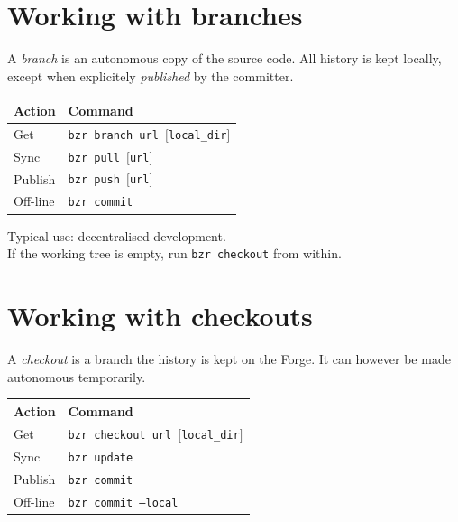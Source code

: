 \documentclass[tumble,foldmark,a4paper]{leaflet}
\begin{document}
\section*{Working with branches}

A \textit{branch} is an autonomous copy of the source code. All history
is kept locally, except when explicitely \textit{published} by the
committer.

\vspace{-0.5em}

\begin{center}
 \begin{tabular}{l l}
  \textbf{Action} & \textbf{Command} \\
  \hline
  Get & \texttt{bzr branch url $[$local\_dir$]$} \\
  Sync & \texttt{bzr pull $[$url$]$} \\
  Publish & \texttt{bzr push $[$url$]$} \\
  Off-line & \texttt{bzr commit} \\
 \end{tabular}
\end{center}

Typical use: decentralised development. \\

If the working tree is empty, run \texttt{bzr checkout} from within.

\section*{Working with checkouts}

A \textit{checkout} is a branch the history is kept on the Forge. It can
however be made autonomous temporarily.

\vspace{-0.5em}

\begin{center}
 \begin{tabular}{l l}
  \textbf{Action} & \textbf{Command} \\
  \hline
  Get & \texttt{bzr checkout url $[$local\_dir$]$} \\
  Sync & \texttt{bzr update} \\
  Publish & \texttt{bzr commit} \\
  Off-line & \texttt{bzr commit --local} \\
 \end{tabular}
\end{center}
\end{document}
